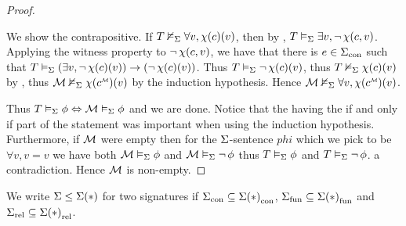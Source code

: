 \begin{proof}
\begin{itemize}
            \begin{backward}
                We show the contrapositive.
                If $T \nvDash_{\Sigma} \forall v, \chi(c) (v)$, 
                then by ,
                $T \vDash_{\Sigma} \exists v, \neg\, \chi(c,v)$.
                Applying the witness property to $\neg\, \chi(c,v)$,
                we have that there is $e \in {\Sigma}_\mathrm{con}$ such that 
                $T \vDash_{\Sigma} (\exists v, \neg\, \chi(c) (v)) \to (\neg\, \chi(c) (v))$.
                Thus $T \vDash_{\Sigma} \neg\, \chi(c) (v)$,
                thus $T \nvDash_{\Sigma} \chi(c) (v)$ by ,
                thus $\MM \nodel{\Si} \chi(\mmintp{c}) (v)$ by the induction hypothesis.
                Hence $\MM \nodel{\Si} \forall v, \chi(\mmintp{c}) (v)$.
            \end{backward}
    \end{itemize}
    Thus $T \vDash_{\Sigma} \phi \Leftrightarrow \mathcal{M} \vDash_{\Sigma} \phi$ and we are done. 
    Notice that the having the if and only if part of the statement 
    was important when using the induction hypothesis.
    Furthermore, 
    if ${\mathcal{M}}$ were empty then for the 
    $\Sigma$-sentence $phi$ which we pick to be $\forall v, v = v$
    we have both $\mathcal{M} \vDash_{\Sigma} \phi$ and $\mathcal{M} \vDash_{\Sigma} \neg\, \phi$
    thus $T \vDash_{\Sigma} \phi$ and $T \vDash_{\Sigma} \neg\, \phi$. 
    a contradiction.
    Hence ${\mathcal{M}}$ is non-empty.
\end{proof}

\begin{nttn}
    We write $\Sigma \leq \Sigma(*)$ for two signatures if
    ${\Sigma}_\mathrm{con} \subseteq {\Sigma(*)}_\mathrm{con}$,
    ${\Sigma}_\mathrm{fun} \subseteq {\Sigma(*)}_\mathrm{fun}$ and ${\Sigma}_\mathrm{rel} \subseteq {\Sigma(*)}_\mathrm{rel}$.
\end{nttn}

